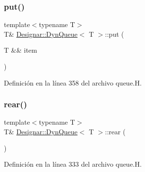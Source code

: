 \mbox{\label{class_designar_1_1_dyn_queue_a53c4e234aacf16fdb7e99625edadad61}} 
\subsubsection{\texorpdfstring{put()}{put()}\hspace{0.1cm}{\footnotesize\ttfamily [2/2]}}
{\footnotesize\ttfamily template$<$typename T$>$ \\
T\& \hyperlink{class_designar_1_1_dyn_queue}{Designar\+::\+Dyn\+Queue}$<$ T $>$\+::put (\begin{DoxyParamCaption}\item[{T \&\&}]{item }\end{DoxyParamCaption})\hspace{0.3cm}{\ttfamily [inline]}}



Definición en la línea 358 del archivo queue.\+H.

\mbox{\label{class_designar_1_1_dyn_queue_a735f5a7d869689994d81d593b1924c68}} 
\subsubsection{\texorpdfstring{rear()}{rear()}\hspace{0.1cm}{\footnotesize\ttfamily [1/2]}}
{\footnotesize\ttfamily template$<$typename T$>$ \\
T\& \hyperlink{class_designar_1_1_dyn_queue}{Designar\+::\+Dyn\+Queue}$<$ T $>$\+::rear (\begin{DoxyParamCaption}{ }\end{DoxyParamCaption})\hspace{0.3cm}{\ttfamily [inline]}}



Definición en la línea 333 del archivo queue.\+H.

\mbox{\label{class_designar_1_1_dyn_queue_a378a92d95bb351f2cc1b8fb80f6c9525}} 
